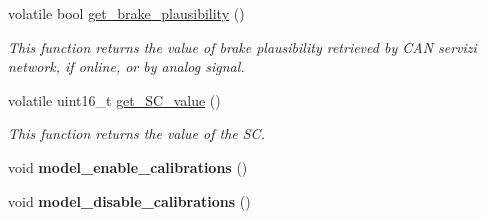 \begin{DoxyCompactItemize}
volatile bool \mbox{\hyperlink{group___board__model__group_gad47b702f79115e19d75b22f39b45efeb}{get\+\_\+brake\+\_\+plausibility}} ()
\begin{DoxyCompactList}\small\item\em This function returns the value of brake plausibility retrieved by C\+AN servizi network, if online, or by analog signal. \end{DoxyCompactList}\item 
volatile uint16\+\_\+t \mbox{\hyperlink{group___board__model__group_ga36eddbc000c8d1820fd2a644a39c87ea}{get\+\_\+\+S\+C\+\_\+value}} ()
\begin{DoxyCompactList}\small\item\em This function returns the value of the SC. \end{DoxyCompactList}\item 
\mbox{\label{group___board__model__group_ga56b9cca331f294c3249df72b9f37ff2a}} 
void {\bfseries model\+\_\+enable\+\_\+calibrations} ()
\item 
\mbox{\label{group___board__model__group_ga8ce089b65afda1dee23f7ecefd0cb873}} 
void {\bfseries model\+\_\+disable\+\_\+calibrations} ()
\end{DoxyCompactItemize}
